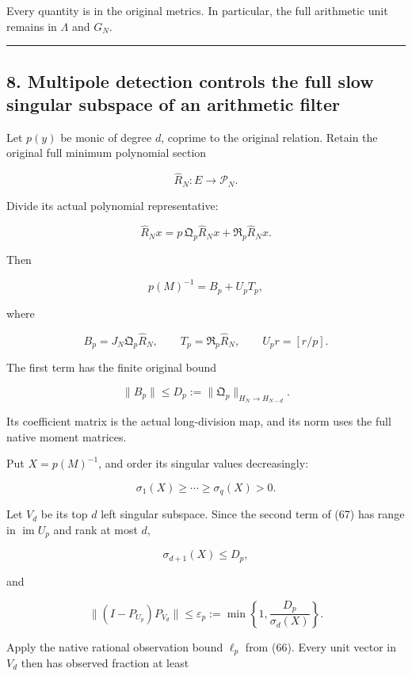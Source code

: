\documentclass[11pt]{article}
\begin{document}
Every quantity is in the original metrics. In particular, the full arithmetic unit remains in \(\Lambda\) and \(G_N\).

\begin{center}\rule{0.5\linewidth}{0.5pt}\end{center}

\subsection{8. Multipole detection controls the full slow singular subspace of an arithmetic filter}\label{multipole-detection-controls-the-full-slow-singular-subspace-of-an-arithmetic-filter}

Let \(p(y)\) be monic of degree \(d\), coprime to the original relation. Retain the original full minimum polynomial section

\[
\widehat R_N:E\to\mathcal P_N.
\]

Divide its actual polynomial representative:

\[
\widehat R_Nx
=
p\,\mathfrak Q_p\widehat R_Nx
+\mathfrak R_p\widehat R_Nx.
\]

Then

\[
\boxed{
p(M)^{-1}
=
B_p+U_pT_p,
}
\tag{67}
\]

where

\[
B_p=J_N\mathfrak Q_p\widehat R_N,
\qquad
T_p=\mathfrak R_p\widehat R_N,
\qquad
U_pr=[r/p].
\]

The first term has the finite original bound

\[
\|B_p\|
\le
D_p:=
\|\mathfrak Q_p\|_{H_N\to H_{N-d}}.
\tag{68}
\]

Its coefficient matrix is the actual long-division map, and its norm uses the full native moment matrices.

Put \(X=p(M)^{-1}\), and order its singular values decreasingly:

\[
\sigma_1(X)\ge\cdots\ge\sigma_q(X)>0.
\]

Let \(V_d\) be its top \(d\) left singular subspace. Since the second term of (67) has range in \(\operatorname{im}U_p\) and rank at most \(d\),

\[
\sigma_{d+1}(X)\le D_p,
\]

and

\[
\boxed{
\|(I-P_{U_p})P_{V_d}\|
\le
\varepsilon_p:=
\min\left\{1,\frac{D_p}{\sigma_d(X)}\right\}.
}
\tag{69}
\]

Apply the native rational observation bound \(\ell_p\) from (66). Every unit vector in \(V_d\) then has observed fraction at least
\end{document}
